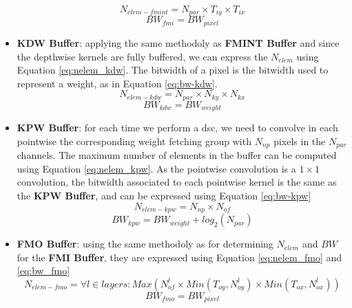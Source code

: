 \begin{itemize}
    \begin{equation}
        N_{elem-fmint} = N_{par} \times T_{iy} \times T_{ix}
        \label{eq:nelem_fmint}
    \end{equation}
    \begin{equation}
        BW_{fmi} = BW_{pixel}
        \label{eq:bw-fmint}
    \end{equation}
    \item \textbf{KDW Buffer}: applying the same methodoly as \textbf{FMINT Buffer} and since the depthwise kernels are fully buffered, we can express the $N_{elem}$ using Equation \eqref{eq:nelem_kdw}. The bitwidth of a pixel is the bitwidth used to represent a weight, as in Equation \eqref{eq:bw-kdw}.
    \begin{equation}
        N_{elem-kdw} = N_{par} \times N_{ky} \times N_{kx}
        \label{eq:nelem_kdw}
    \end{equation}
    \begin{equation}
        BW_{kdw} = BW_{weight}
        \label{eq:bw-kdw}
    \end{equation}
    \item \textbf{KPW Buffer}: for each time we perform a \acrshort{dsc}, we need to convolve in each pointwise the corresponding weight fetching group with $N_{np}$ pixels in the $N_{par}$ channels. The maximum number of elements in the buffer can be computed using Equation \eqref{eq:nelem_kpw}. As the pointwise convolution is a $1 \times 1$ convolution, the bitwidth associated to each pointwise kernel is the same as the \textbf{KPW Buffer}, and can be expressed using Equation \ref{eq:bw-kpw}
    \begin{equation}
        N_{elem-kpw} = N_{np} \times N_{of}
        \label{eq:nelem_kpw}
    \end{equation}
    \begin{equation}
        BW_{kpw} = BW_{weight} + log_2(N_{par})
        \label{eq:bw-kpw}
    \end{equation}
    \item \textbf{FMO Buffer}: using the same methodoly as for determining $N_{elem}$ and $BW$ for the \textbf{FMI Buffer}, they are expressed using Equation \eqref{eq:nelem_fmo} and \eqref{eq:bw_fmo}
    \begin{equation}
        N_{elem-fmo} = \forall l \in layers: Max\left( N_{of}^l \times Min\left(T_{oy}, N_{oy}^l\right) \times Min\left(T_{ox}, N_{ox}^l\right) \right)
        \label{eq:nelem_fmo}
    \end{equation}
    \begin{equation}
        BW_{fmo} = BW_{pixel}
        \label{eq:bw_fmo}
    \end{equation}
\end{itemize}
